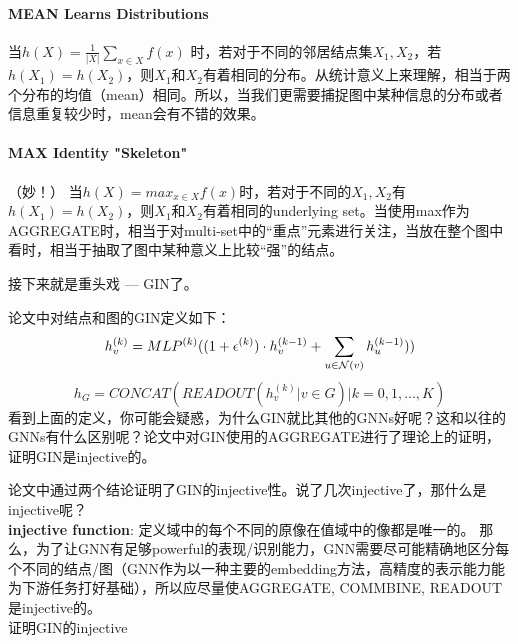 \paragraph{MEAN Learns Distributions} 当$h(X) = \frac{1}{|X|}\sum_{x\in X} f(x)$ 时，若对于不同的邻居结点集$X_1, X_2$，若$h(X_1) = h(X_2)$，则$X_1$和$X_2$有着相同的分布。从统计意义上来理解，相当于两个分布的均值（mean）相同。所以，当我们更需要捕捉图中某种信息的分布或者信息重复较少时，mean会有不错的效果。

\paragraph{MAX Identity "Skeleton"}（妙！） 当$h(X) = max_{x\in X}f(x)$时，若对于不同的$X_1, X_2$有$h(X_1) = h(X_2)$，则$X_1$和$X_2$有着相同的underlying set。当使用max作为AGGREGATE时，相当于对multi-set中的“重点”元素进行关注，当放在整个图中看时，相当于抽取了图中某种意义上比较“强”的结点。

\par 接下来就是重头戏 --- GIN了。
\par 论文中对结点和图的GIN定义如下：
$$
h_v^{(k)} = MLP^{(k)} ((1+\epsilon^{(k)} ) \cdot h_v^{(k-1)}+\sum_{u \in \mathcal{N}(v)} h_u^{(k-1)} ))  \newline
$$
$$
h_G = CONCAT(READOUT({h_v^{(k)} | v \in G}) | k = 0,1,...,K)
$$
看到上面的定义，你可能会疑惑，为什么GIN就比其他的GNNs好呢？这和以往的GNNs有什么区别呢？论文中对GIN使用的AGGREGATE进行了理论上的证明，证明GIN是injective的。
\par 论文中通过两个结论证明了GIN的injective性。说了几次injective了，那什么是injective呢？\\
\textbf{injective function}: 定义域中的每个不同的原像在值域中的像都是唯一的。
那么，为了让GNN有足够powerful的表现/识别能力，GNN需要尽可能精确地区分每个不同的结点/图（GNN作为以一种主要的embedding方法，高精度的表示能力能为下游任务打好基础），所以应尽量使AGGREGATE, COMMBINE, READOUT 是injective的。\\
{\color{red}证明GIN的injective}


